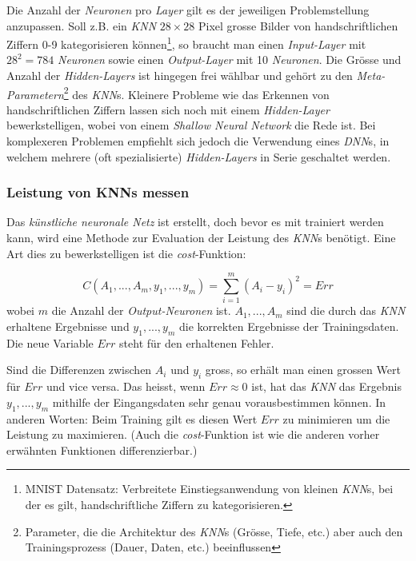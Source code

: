 Die Anzahl der \textit{Neuronen} pro \textit{Layer} gilt es der jeweiligen Problemstellung anzupassen. Soll z.B. ein \textit{KNN} $28\times 28$ Pixel grosse Bilder von handschriftlichen Ziffern 0-9 kategorisieren können\footnote{MNIST Datensatz\cite{mnist}: Verbreitete Einstiegsanwendung von kleinen \textit{KNN}s, bei der es gilt, handschriftliche Ziffern zu kategorisieren.}, so braucht man einen \textit{Input-Layer} mit $28^2=784$ \textit{Neuronen} sowie einen \textit{Output-Layer} mit 10 \textit{Neuronen}. Die Grösse und Anzahl der \textit{Hidden-Layers} ist hingegen frei wählbar und gehört zu den \textit{Meta-Parametern}\footnote{Parameter, die die Architektur des \textit{KNN}s (Grösse, Tiefe, etc.) aber auch den Trainingsprozess (Dauer, Daten, etc.) beeinflussen} des \textit{KNN}s. Kleinere Probleme wie das Erkennen von handschriftlichen Ziffern lassen sich noch mit einem \textit{Hidden-Layer} bewerkstelligen, wobei von einem \textit{Shallow Neural Network} die Rede ist. Bei komplexeren Problemen empfiehlt sich jedoch die Verwendung eines \textit{DNN}s, in welchem mehrere (oft spezialisierte) \textit{Hidden-Layers} in Serie geschaltet werden.

\subsubsection{Leistung von KNNs messen}\label{cha:theo:cost}

Das \textit{künstliche neuronale Netz} ist erstellt, doch bevor es mit trainiert werden kann, wird eine Methode zur Evaluation der Leistung des \textit{KNN}s benötigt. Eine Art dies zu bewerkstelligen ist die \textit{cost}-Funktion:

\begin{equation}\label{eq:cost}
C(A_1,...,A_m,y_1,...,y_m)=\sum_{i=1}^{m}\left(A_i-y_i\right)^2=Err
\end{equation}
wobei $m$ die Anzahl der \textit{Output-Neuronen} ist. $A_1,...,A_m$ sind die durch das \textit{KNN} erhaltene Ergebnisse und $y_1,...,y_m$ die korrekten Ergebnisse der Trainingsdaten. Die neue Variable $Err$ steht für den erhaltenen Fehler.

Sind die Differenzen zwischen $A_i$ und $y_i$ gross, so erhält man einen grossen Wert für $Err$ und vice versa. Das heisst, wenn $Err \approx 0$ ist, hat das \textit{KNN} das Ergebnis $y_1,...,y_m$ mithilfe der Eingangsdaten sehr genau vorausbestimmen können. In anderen Worten: Beim Training gilt es diesen Wert $Err$ zu minimieren um die Leistung zu maximieren. (Auch die \textit{cost}-Funktion ist wie die anderen vorher erwähnten Funktionen differenzierbar.)


